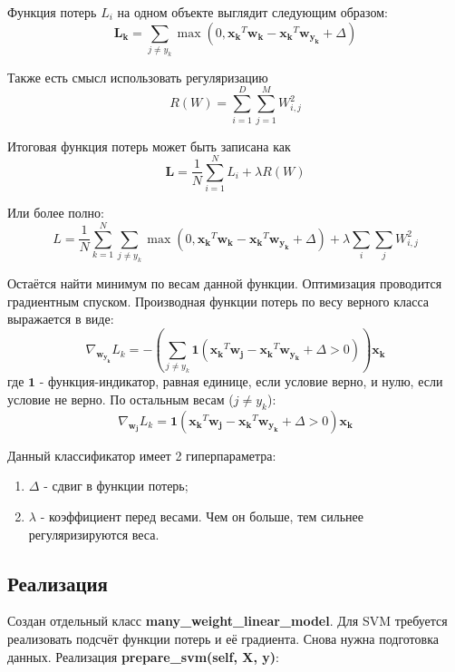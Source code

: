 \documentclass[a4paper]{article}
\newcommand{\wk}{\bm{w_k}}
\newcommand{\xk}{\bm{x_k}}
\begin{document}
Функция потерь $L_i$ на одном объекте выглядит следующим образом:
\begin{equation}
\bm{L_k} = \sum_{j \neq y_k}\max{(0, \xk^T\wk - \xk^T\bm{w_{y_k}} + \Delta)}
\end{equation}

Также есть смысл использовать регуляризацию 
\begin{equation}
R(W) = \sum_{i = 1}^{D}\sum_{j = 1}^M W_{i,j}^2
\end{equation}

Итоговая функция потерь может быть записана как
\begin{equation*}
\bm{L} = \frac{1}{N}\sum_{i = 1}^N L_i + \lambda R(W)
\end{equation*}

Или более полно:
\begin{equation}
L = \frac{1}{N}\sum_{k = 1}^N\sum_{j \neq y_k}\max{(0, \xk^T\wk - \xk^T\bm{w_{y_k}} + \Delta)}  + \lambda\sum_i\sum_j W_{i,j}^2
\end{equation}

Остаётся найти минимум по весам данной функции. Оптимизация проводится градиентным спуском. Производная функции потерь по весу верного класса выражается в виде:
\begin{equation}
\nabla_{\bm{w_{y_k}}} L_k = -\left(\sum_{j \neq y_k} \bm{1}(\xk^T\bm{w_j} - \xk^T\bm{w_{y_k}} + \Delta > 0)\right) \xk
\end{equation}
где $\bm{1}$ - функция-индикатор, равная единице, если условие верно, и нулю, если условие не верно.
По остальным весам ($j \neq y_k$):
\begin{equation}
\nabla_{\bm{w_j}} L_k = \bm{1}(\xk^T\bm{w_j} - \xk^T\bm{w_{y_k}} + \Delta > 0) \xk
\end{equation}

Данный классификатор имеет 2 гиперпараметра:
\begin{enumerate}
\item $\Delta$ - сдвиг в функции потерь;
\item $\lambda$ - коэффициент перед весами. Чем он больше, тем сильнее регуляризируются веса.
\end{enumerate}

\subsection{Реализация}
Создан отдельный класс \textbf{many\_weight\_linear\_model}. Для SVM требуется реализовать подсчёт функции потерь и её градиента. Снова нужна подготовка данных. Реализация \textbf{prepare\_svm(self, X, y)}:
\end{document}
